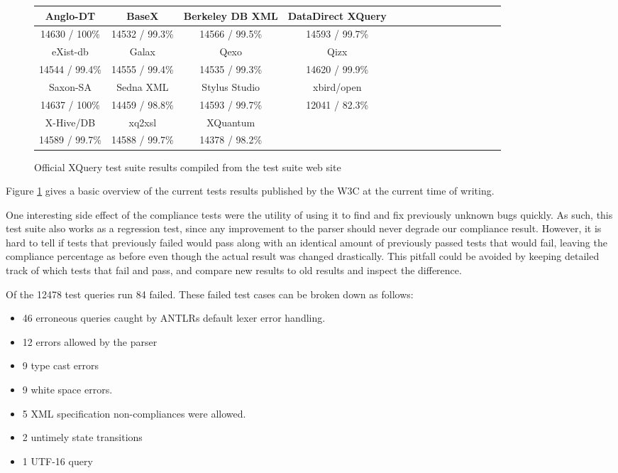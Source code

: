 \begin{figure}[h!]
  \begin{center}
    \begin{tabular}{ |c | c | c | c | c | c | c | c | c | c | c | c | c | c | c | }
      \hline
      Anglo-DT        & BaseX           & Berkeley DB XML   & DataDirect XQuery \\ \hline
      14630 / 100\%   & 14532 / 99.3\%  & 14566 / 99.5\%    & 14593 / 99.7\%  \\ \hline \hline
      eXist-db        & Galax           & Qexo              & Qizx \\ \hline            
      14544 / 99.4\%  & 14555 / 99.4\%  & 14535 / 99.3\%    & 14620 / 99.9\% \\ \hline \hline
      Saxon-SA        & Sedna XML       & Stylus Studio     & xbird/open \\ \hline
      14637 / 100\%   & 14459 / 98.8\%  & 14593 / 99.7\%    & 12041 / 82.3\% \\ \hline \hline
      X-Hive/DB       & xq2xsl          & XQuantum          & \\ \hline
      14589 / 99.7\%   & 14588 / 99.7\%  & 14378 / 98.2\%    & \\ 
    \hline
    \end{tabular}
  \end{center}
  \caption[Official XQuery test suite results]{Official XQuery test suite
  results compiled from the test suite web site\cite{w3ctestresults}} 
  \label{figure:table:w3c_test_results}
\end{figure}

Figure \ref{figure:table:w3c_test_results} gives a basic overview of the current
tests results published by the W3C at the current time of writing.

One interesting side effect of the compliance tests were the utility of using it to
find and fix previously unknown bugs quickly. As such, this test suite also
works as a regression test, since any improvement to the parser should
never degrade our compliance result. However, it is hard to tell if tests that
previously failed would pass along with an identical amount of previously
passed tests that would fail, leaving the compliance percentage as before even
though the actual result was changed drastically. This pitfall could be
avoided by keeping detailed track of which tests that fail and pass, and compare
new results to old results and inspect the difference.

Of the 12478 test queries run 84 failed. These failed test cases can be broken
down as follows: 
\begin{itemize}
\item 46 erroneous queries caught by ANTLRs default lexer error handling.
\item 12 errors allowed by the parser
\item 9 type cast errors
\item 9 white space errors.
\item 5 XML specification non-compliances were allowed.
\item 2 untimely state transitions
\item 1 UTF-16 query
\end{itemize}

